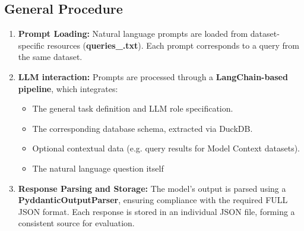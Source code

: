 \documentclass[12pt,a4paper]{article}
\begin{document}
\subsection{General Procedure}
\begin{enumerate}
    \item  \textbf{Prompt Loading:} Natural language prompts are loaded from dataset-specific resources (\textbf{queries\_<dataset-name>.txt}). Each prompt corresponds to a query from the same dataset.
    \item \textbf{LLM interaction:} Prompts are processed through a \textbf{LangChain-based pipeline}, which integrates:
    \begin{itemize}
        \item The general task definition and LLM role specification.
        \item The corresponding database schema, extracted via DuckDB.
        \item Optional contextual data (e.g. query results for Model Context datasets).
        \item The natural language question itself
    \end{itemize}
    \item \textbf{Response Parsing and Storage:} The model's output is parsed using a \textbf{PyddanticOutputParser}, ensuring compliance with the required FULL JSON format. Each response is stored in an individual JSON file, forming a consistent source for evaluation.
\end{enumerate}
\end{document}
